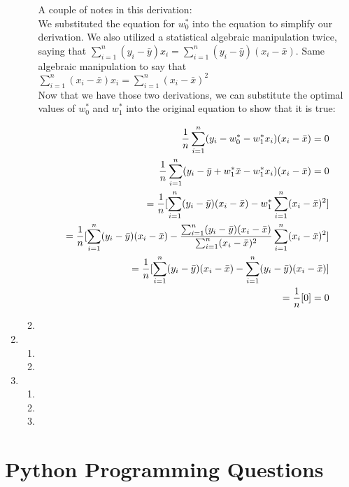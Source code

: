 \documentclass[12pt]{article}
\begin{document}
\begin{enumerate}
\begin{enumerate}
 A couple of notes in this derivation: \\ 

 We substituted the equation for $w_0^*$ into the equation to simplify our derivation. We also utilized a statistical algebraic manipulation twice, 
 saying that $\sum_{i=1}^{n} (y_i - \bar{y})x_i = \sum_{i=1}^{n} (y_i - \bar{y})(x_i - \bar{x})$. Same algebraic manipulation to say that 
 $\sum_{i=1}^{n} (x_i - \bar{x})x_i = \sum_{i=1}^{n} (x_i - \bar{x})^2$\\ 

 Now that we have those two derivations, we can substitute the optimal values of $w_0^*$ and $w_1^*$ into the original equation to show that it is true:

 \begin{align}
  \frac{1}{n} \sum_{i=1}^{n} (y_i - w^*_0 - w_{1}^{*}x_i)(x_i-\bar{x}) = 0 \notag \\ 
  \frac{1}{n} \sum_{i=1}^{n} (y_i - \bar{y} + w_1^* \bar{x} - w_1^*x_i) (x_i - \bar{x}) = 0 \notag \\ 
  = \frac{1}{n} [\sum_{i=1}^{n}(y_i-\bar{y})(x_i-\bar{x}) - w_1^* \sum_{i=1}^{n}(x_i-\bar{x})^2] \notag \\ 
  = \frac{1}{n}[\sum_{i=1}^{n}(y_i-\bar{y})(x_i-\bar{x}) - \frac{\sum_{i=1}^{n} (y_i - \bar{y})(x_i - \bar{x})}{\sum_{i=1}^{n} (x_i-\bar{x})^2} \sum_{i=1}^{n}(x_i-\bar{x})^2] \notag \\ 
  = \frac{1}{n}[\sum_{i=1}^{n}(y_i-\bar{y})(x_i-\bar{x}) - \sum_{i=1}^{n} (y_i - \bar{y})(x_i - \bar{x})] \notag \\  
  = \frac{1}{n} [0] = 0 \notag
 \end{align}
 \item 
  \end{enumerate}

\item
  \begin{enumerate}
  \item
  \item
  \end{enumerate}
 \item
 \begin{enumerate}
     \item 
     \item 
     \item
 \end{enumerate}
\end{enumerate}

\section{Python Programming Questions}

\end{document}
